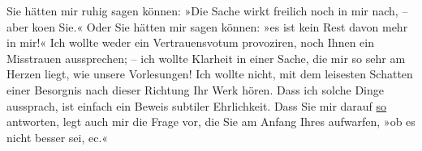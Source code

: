 \pstart
           Sie hätten mir ruhig sagen können: »Die Sache wirkt freilich noch in mir nach, – aber
                  ko{\geminationm}en {\pb}Sie.« Oder Sie hätten mir sagen
               können: »es ist kein Rest davon mehr in mir!« Ich wollte weder ein Vertrauensvotum
               provoziren, noch Ihnen ein Misstrauen aussprechen; – ich wollte Klarheit in einer
               Sache, die mir so sehr am Herzen liegt, wie unsere Vorlesungen! Ich wollte nicht, mit
               dem leisesten Schatten einer Besorgnis nach dieser Richtung Ihr Werk hören. Dass ich solche Dinge
               aussprach, ist einfach ein Beweis subtiler Ehrlichkeit. Dass Sie mir darauf \uline{so} antworten, legt auch mir die Frage vor, die Sie am
               Anfang Ihres \label{K_L03355-4v}\label{K_L03355-4} aufwarfen, »ob es nicht besser sei, ec.«\pend
           
